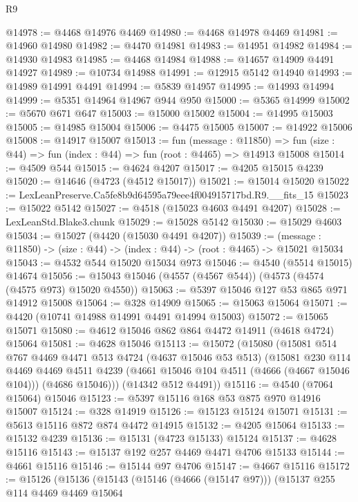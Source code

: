 \begin{lexlean}{R9}
\begin{coremodule}
@14978 := @4468 @14976 @4469
@14980 := @4468 @14978 @4469
@14981 := @14960 @14980
@14982 := @4470 @14981
@14983 := @14951 @14982
@14984 := @14930 @14983
@14985 := @4468 @14984
@14988 := @14657 @14909 @4491 @14927
@14989 := @10734 @14988
@14991 := @12915 @5142 @14940
@14993 := @14989 @14991 @4491
@14994 := @5839 @14957
@14995 := @14993 @14994
@14999 := @5351 @14964 @14967 @944 @950
@15000 := @5365 @14999
@15002 := @5670 @671 @647
@15003 := @15000 @15002
@15004 := @14995 @15003
@15005 := @14985 @15004
@15006 := @4475 @15005
@15007 := @14922 @15006
@15008 := @14917 @15007
@15013 := fun (message : @11850) =>
  fun (size : @44) => fun (index : @44) => fun (root : @4465) => @14913 @15008
@15014 := @4509 @544
@15015 := @4624 @4207
@15017 := @4205 @15015 @4239
@15020 := @14646 (@4723 (@4512 @15017))
@15021 := @15014 @15020
@15022 := LexLeanPreserve.Ca5fe8b9d64595a79eee4f004915717bd.R9.__fits_15
@15023 := @15022 @5142
@15027 := @4518 (@15023 @4603 @4491 @4207)
@15028 := LexLeanStd.Blake3.chunk
@15029 := @15028 @5142
@15030 := @15029 @4603
@15034 := @15027 (@4420 (@15030 @4491 @4207))
@15039 := (message : @11850) -> (size : @44) -> (index : @44) -> (root : @4465) -> @15021 @15034
@15043 := @4532 @544 @15020 @15034 @973
@15046 := @4540 (@5514 @15015) @14674
@15056 := @15043 @15046 (@4557 (@4567 @544)) (@4573 (@4574 (@4575 @973) @15020 @4550))
@15063 := @5397 @15046 @127 @53 @865 @971 @14912 @15008
@15064 := @328 @14909
@15065 := @15063 @15064
@15071 := @4420 (@10741 @14988 @14991 @4491 @14994 @15003)
@15072 := @15065 @15071
@15080 := @4612 @15046 @862 @864 @4472 @14911 (@4618 @4724) @15064
@15081 := @4628 @15046
@15113 := @15072
    (@15080
      (@15081
        @514
        @767
        @4469
        @4471
        @513
        @4724
        (@4637 @15046 @53 @513)
        (@15081
          @230
          @114
          @4469
          @4469
          @4511
          @4239
          (@4661 @15046 @104 @4511 (@4666 (@4667 @15046 @104)))
          (@4686 @15046)))
      (@14342 @512 @4491))
@15116 := @4540 (@7064 @15064) @15046
@15123 := @5397 @15116 @168 @53 @875 @970 @14916 @15007
@15124 := @328 @14919
@15126 := @15123 @15124 @15071
@15131 := @5613 @15116 @872 @874 @4472 @14915
@15132 := @4205 @15064
@15133 := @15132 @4239
@15136 := @15131 (@4723 @15133) @15124
@15137 := @4628 @15116
@15143 := @15137 @192 @257 @4469 @4471 @4706 @15133
@15144 := @4661 @15116
@15146 := @15144 @97 @4706
@15147 := @4667 @15116
@15172 := @15126
    (@15136
      (@15143
        (@15146 (@4666 (@15147 @97)))
        (@15137
          @255
          @114
          @4469
          @4469
          @15064

\end{coremodule}
\end{lexlean}
